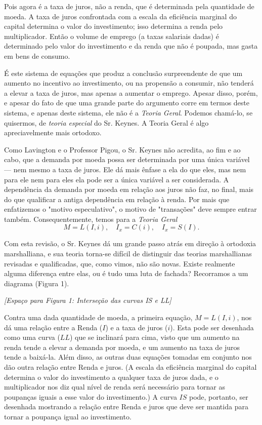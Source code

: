 \documentclass[12pt]{article}
\begin{document}
Pois agora é a taxa de juros, não a renda, que é determinada pela quantidade de moeda. A taxa de juros confrontada com a escala da eficiência marginal do capital determina o valor do investimento; isso determina a renda pelo multiplicador. Então o volume de emprego (a taxas salariais dadas) é determinado pelo valor do investimento e da renda que não é poupada, mas gasta em bens de consumo.

É este sistema de equações que produz a conclusão surpreendente de que um aumento no incentivo ao investimento, ou na propensão a consumir, não tenderá a elevar a taxa de juros, mas apenas a aumentar o emprego. Apesar disso, porém, e apesar do fato de que uma grande parte do argumento corre em termos deste sistema, e apenas deste sistema, ele não é a \textit{Teoria Geral}. Podemos chamá-lo, se quisermos, de \textit{teoria especial} do Sr. Keynes. A Teoria Geral é algo apreciavelmente mais ortodoxo.

Como Lavington e o Professor Pigou, o Sr. Keynes não acredita, ao fim e ao cabo, que a demanda por moeda possa ser determinada por uma única variável — nem mesmo a taxa de juros. Ele dá mais ênfase a ela do que eles, mas nem para ele nem para eles ela pode ser a única variável a ser considerada. A dependência da demanda por moeda em relação aos juros não faz, no final, mais do que qualificar a antiga dependência em relação à renda. Por mais que enfatizemos o "motivo especulativo", o motivo de "transações" deve sempre entrar também. Consequentemente, temos para a \textit{Teoria Geral}
\[ M = L(I, i), \quad I_x = C(i), \quad I_x = S(I). \]

Com esta revisão, o Sr. Keynes dá um grande passo atrás em direção à ortodoxia marshalliana, e sua teoria torna-se difícil de distinguir das teorias marshallianas revisadas e qualificadas, que, como vimos, não são novas. Existe realmente alguma diferença entre elas, ou é tudo uma luta de fachada? Recorramos a um diagrama (Figura 1).

\begin{center}
\textit{[Espaço para Figura 1: Interseção das curvas IS e LL]}
\end{center}

Contra uma dada quantidade de moeda, a primeira equação, $M = L(I, i)$, nos dá uma relação entre a Renda ($I$) e a taxa de juros ($i$). Esta pode ser desenhada como uma curva ($LL$) que se inclinará para cima, visto que um aumento na renda tende a elevar a demanda por moeda, e um aumento na taxa de juros tende a baixá-la. Além disso, as outras duas equações tomadas em conjunto nos dão outra relação entre Renda e juros. (A escala da eficiência marginal do capital determina o valor do investimento a qualquer taxa de juros dada, e o multiplicador nos diz qual nível de renda será necessário para tornar as poupanças iguais a esse valor do investimento.) A curva $IS$ pode, portanto, ser desenhada mostrando a relação entre Renda e juros que deve ser mantida para tornar a poupança igual ao investimento.
\end{document}
